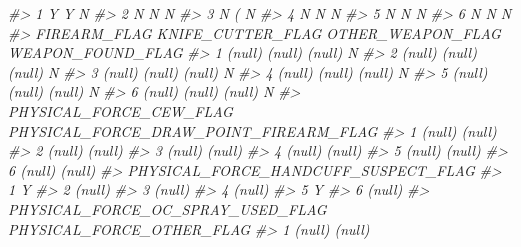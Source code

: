 \documentclass[
]{krantz}
\makeatletter
\newenvironment{Shaded}{\begin{snugshade}}{\end{snugshade}}
\newcommand{\CommentTok}[1]{\textcolor[rgb]{0.37,0.37,0.37}{\textit{#1}}}
\newenvironment{kframe}{%
\medskip{}
\setlength{\fboxsep}{.8em}
 \def\at@end@of@kframe{}%
 \ifinner\ifhmode%
  \def\at@end@of@kframe{\end{minipage}}%
  \begin{minipage}{\columnwidth}%
 \fi\fi%
 \def\FrameCommand##1{\hskip\@totalleftmargin \hskip-\fboxsep
 \colorbox{shadecolor}{##1}\hskip-\fboxsep
     \hskip-\linewidth \hskip-\@totalleftmargin \hskip\columnwidth}%
 \MakeFramed {\advance\hsize-\width
   \@totalleftmargin\z@ \linewidth\hsize
   \@setminipage}}%
 {\par\unskip\endMakeFramed%
 \at@end@of@kframe}
\renewenvironment{Shaded}{\begin{kframe}}{\end{kframe}}
\makeatother
\begin{document}
\begin{Shaded}
\begin{Highlighting}[]
\CommentTok{\#\textgreater{} 1                   Y                 Y                     N}
\CommentTok{\#\textgreater{} 2                   N                 N                     N}
\CommentTok{\#\textgreater{} 3                   N                 (                     N}
\CommentTok{\#\textgreater{} 4                   N                 N                     N}
\CommentTok{\#\textgreater{} 5                   N                 N                     N}
\CommentTok{\#\textgreater{} 6                   N                 N                     N}
\CommentTok{\#\textgreater{}   FIREARM\_FLAG KNIFE\_CUTTER\_FLAG OTHER\_WEAPON\_FLAG WEAPON\_FOUND\_FLAG}
\CommentTok{\#\textgreater{} 1       (null)            (null)            (null)                 N}
\CommentTok{\#\textgreater{} 2       (null)            (null)            (null)                 N}
\CommentTok{\#\textgreater{} 3       (null)            (null)            (null)                 N}
\CommentTok{\#\textgreater{} 4       (null)            (null)            (null)                 N}
\CommentTok{\#\textgreater{} 5       (null)            (null)            (null)                 N}
\CommentTok{\#\textgreater{} 6       (null)            (null)            (null)                 N}
\CommentTok{\#\textgreater{}   PHYSICAL\_FORCE\_CEW\_FLAG PHYSICAL\_FORCE\_DRAW\_POINT\_FIREARM\_FLAG}
\CommentTok{\#\textgreater{} 1                  (null)                                 (null)}
\CommentTok{\#\textgreater{} 2                  (null)                                 (null)}
\CommentTok{\#\textgreater{} 3                  (null)                                 (null)}
\CommentTok{\#\textgreater{} 4                  (null)                                 (null)}
\CommentTok{\#\textgreater{} 5                  (null)                                 (null)}
\CommentTok{\#\textgreater{} 6                  (null)                                 (null)}
\CommentTok{\#\textgreater{}   PHYSICAL\_FORCE\_HANDCUFF\_SUSPECT\_FLAG}
\CommentTok{\#\textgreater{} 1                                    Y}
\CommentTok{\#\textgreater{} 2                               (null)}
\CommentTok{\#\textgreater{} 3                               (null)}
\CommentTok{\#\textgreater{} 4                               (null)}
\CommentTok{\#\textgreater{} 5                                    Y}
\CommentTok{\#\textgreater{} 6                               (null)}
\CommentTok{\#\textgreater{}   PHYSICAL\_FORCE\_OC\_SPRAY\_USED\_FLAG PHYSICAL\_FORCE\_OTHER\_FLAG}
\CommentTok{\#\textgreater{} 1                            (null)                    (null)}

\end{Highlighting}
\end{Shaded}
\end{document}
